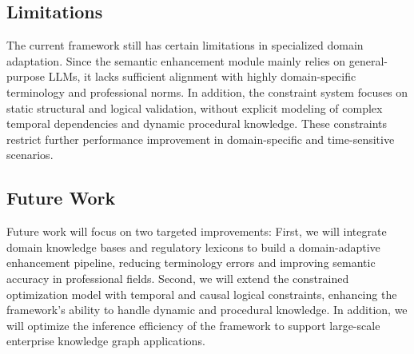 \documentclass[runningheads]{llncs}
\begin{document}
\subsection{Limitations}
The current framework still has certain limitations in specialized domain adaptation.
Since the semantic enhancement module mainly relies on general-purpose LLMs,
it lacks sufficient alignment with highly domain-specific terminology and professional norms.
In addition, the constraint system focuses on static structural and logical validation,
without explicit modeling of complex temporal dependencies and dynamic procedural knowledge.
These constraints restrict further performance improvement in domain-specific and time-sensitive scenarios.

\subsection{Future Work}
Future work will focus on two targeted improvements:
First, we will integrate domain knowledge bases and regulatory lexicons
to build a domain-adaptive enhancement pipeline,
reducing terminology errors and improving semantic accuracy in professional fields.
Second, we will extend the constrained optimization model
with temporal and causal logical constraints,
enhancing the framework’s ability to handle dynamic and procedural knowledge.
In addition, we will optimize the inference efficiency of the framework
to support large-scale enterprise knowledge graph applications.
\end{document}
